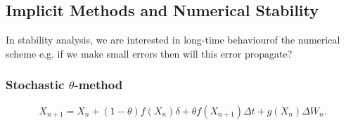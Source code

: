 \documentclass[twocolumn,landscape,10pt]{article}
\theoremstyle{definition}
\begin{document}
\subsection{Implicit Methods and Numerical Stability}

In stability analysis, we are interested in long-time behaviourof the numerical
scheme e.g. if we make small errors then will this error propagate?

\subsubsection{Stochastic $\theta$-method}

\[
    X_{n+1}=X_n+(1-\theta)f(X_n)\delta+\theta f(X_{n+1})\Delta t+g(X_n)\Delta
    W_n.
\]
\end{document}

